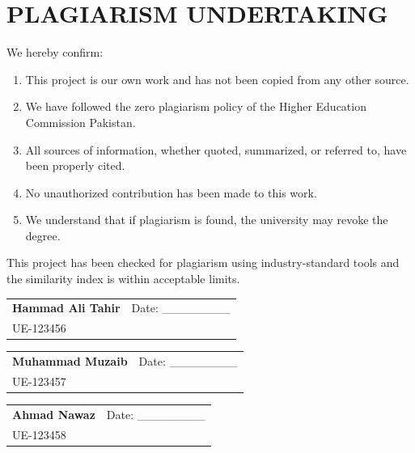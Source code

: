 \documentclass[12pt,a4paper]{book}
\numberwithin{table}{chapter}
\numberwithin{figure}{chapter}
\numberwithin{equation}{chapter}
\begin{document}
\clearpage

\chapter*{PLAGIARISM UNDERTAKING}

\bigskip
We hereby confirm:

\begin{enumerate}
\item This project is our own work and has not been copied from any other source.
\item We have followed the zero plagiarism policy of the Higher Education Commission Pakistan.
\item All sources of information, whether quoted, summarized, or referred to, have been properly cited.
\item No unauthorized contribution has been made to this work.
\item We understand that if plagiarism is found, the university may revoke the degree.
\end{enumerate}

\bigskip
This project has been checked for plagiarism using industry-standard tools and the similarity index is within acceptable limits.

\bigskip\bigskip\bigskip

\begin{tabular}{p{2.5in} p{2.5in}}
 & \\[1\baselineskip]
\hline
\textbf{Hammad Ali Tahir} & Date: \_\_\_\_\_\_\_\_\\[1\baselineskip]
UE-123456 & \\
\end{tabular}

\bigskip

\begin{tabular}{p{2.5in} p{2.5in}}
 & \\[1\baselineskip]
\hline
\textbf{Muhammad Muzaib} & Date: \_\_\_\_\_\_\_\_\\[1\baselineskip]
UE-123457 & \\
\end{tabular}

\bigskip

\begin{tabular}{p{2.5in} p{2.5in}}
 & \\[1\baselineskip]
\hline
\textbf{Ahmad Nawaz} & Date: \_\_\_\_\_\_\_\_\\[1\baselineskip]
UE-123458 & \\
\end{tabular}
\end{document}
